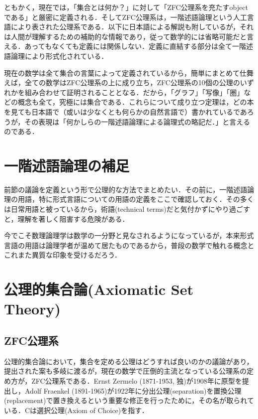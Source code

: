 \documentclass[uplatex, 12pt, a4paper, dvipdfmx]{jsarticle}
\begin{document}
ともかく，現在では，「集合とは何か？」に対して「ZFC公理系を充たすobjectである」と厳密に定義される．そしてZFC公理系は，一階述語論理という人工言語により表された公理系である．以下に日本語による解説も附しているが，それは人間が理解するための補助的な情報であり，従って数学的には省略可能だと言える．あってもなくても定義には関係しない．定義に直結する部分は全て一階述語論理により形式化されている．\par
現在の数学は全て集合の言葉によって定義されているから，簡単にまとめて仕舞えば，全ての数学はZFC公理系の上に成り立ち，ZFC公理系の10個の公理のいずれかを組み合わせて証明されることとなる．だから，「グラフ」「写像」「圏」などの概念も全て，究極には集合である．これらについて成り立つ定理は，どの本を見ても日本語で（或いは少なくとも何らかの自然言語で）書かれているであろうが，その表現は「何かしらの一階述語論理による論理式の略記だ．」と言えるのである．

\section{一階述語論理の補足}

前節の議論を定義という形で公理的な方法でまとめたい．その前に，一階述語論理の用語，特に形式言語についての用語の定義をここで確認しておく．その多くは日常用語と被っているから，術語(technical terms)だと気付かずにやり過ごすと，理解を著しく阻害する危険がある．\par
今でこそ数理論理学は数学の一分野と見なされるようになっているが，本来形式言語の用語は論理学者が温めて居たものであるから，普段の数学で触れる概念とこれまた異質な印象を受けるだろう．

\section{公理的集合論(Axiomatic Set Theory)}

\subsection{ZFC公理系}
公理的集合論において，集合を定める公理はどうすれば良いのかの議論があり，提出された案も多岐に渡るが，現在の数学で圧倒的主流となっている公理系の定め方が，ZFC公理系である．Ernst Zermelo (1871-1953, 独)が1908年に原型を提出し，Adolf Fraenkel (1891-1965)が1922年に分出公理(separation)を置換公理(replacement)で置き換えるという重要な修正を行ったために，その名が取られている．Cは選択公理(Axiom of Choice)を指す．
\end{document}

